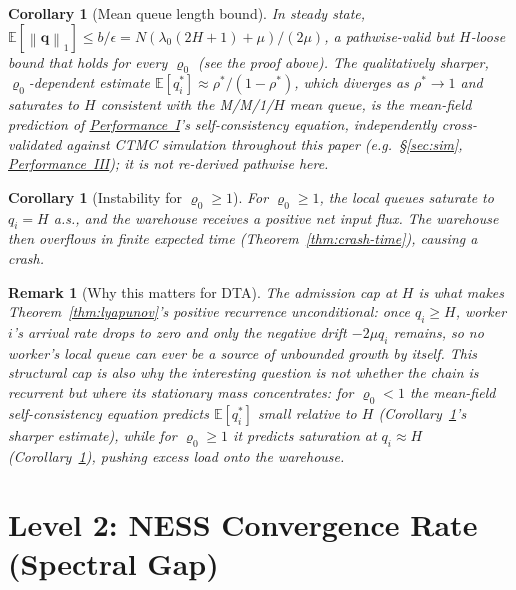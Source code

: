 \documentclass[11pt,a4paper]{article}
\newtheorem{corollary}[theorem]{Corollary}
\newtheorem{remark}{Remark}[section]
\newcommand{\norm}[1]{\left\lVert #1 \right\rVert}
\newcommand{\rhostar}{\rho^{*}}
\newcommand{\rhozero}{\varrho_0}
\begin{document}
\begin{corollary}[Mean queue length bound]
\label{cor:mean-queue}
In steady state, $\mathbb{E}[\norm{\mathbf{q}}_1] \leq b/\epsilon =
N(\lambda_0(2H+1)+\mu)/(2\mu)$, a pathwise-valid but $H$-loose bound
that holds for every $\rhozero$ (see the proof above). The
qualitatively sharper, $\rhozero$-dependent estimate
$\mathbb{E}[q_i^*] \approx \rhostar/(1-\rhostar)$, which diverges as
$\rhostar \to 1$ and saturates to $H$ consistent with the M/M/1/$H$
mean queue, is the mean-field prediction of
\hyperref[chap:load_balance]{Performance~I}'s self-consistency
equation, independently cross-validated against CTMC simulation
throughout this paper (e.g.\ \S\ref{sec:sim},
\hyperref[chap:makespan]{Performance~III}); it is not re-derived
pathwise here.
\end{corollary}

\begin{corollary}[Instability for $\rhozero \geq 1$]
\label{cor:instability}
For $\rhozero \geq 1$, the local queues saturate to $q_i = H$ a.s.,
and the warehouse receives a positive net input flux.
The warehouse then overflows in finite expected time
(Theorem~\ref{thm:crash-time}), causing a crash.
\end{corollary}

\begin{remark}[Why this matters for DTA]
The admission cap at $H$ is what makes Theorem~\ref{thm:lyapunov}'s
positive recurrence unconditional: once $q_i \geq H$, worker $i$'s
arrival rate drops to zero and only the negative drift $-2\mu q_i$
remains, so no worker's local queue can ever be a source of unbounded
growth by itself. This structural cap is also why the interesting
question is not \emph{whether} the chain is recurrent but \emph{where}
its stationary mass concentrates: for $\rhozero<1$ the mean-field
self-consistency equation predicts $\mathbb{E}[q_i^*]$ small relative
to $H$ (Corollary~\ref{cor:mean-queue}'s sharper estimate), while for
$\rhozero\geq 1$ it predicts saturation at $q_i\approx H$
(Corollary~\ref{cor:instability}), pushing excess load onto the
warehouse.
\end{remark}

\section{Level 2: NESS Convergence Rate (Spectral Gap)}
\end{document}
